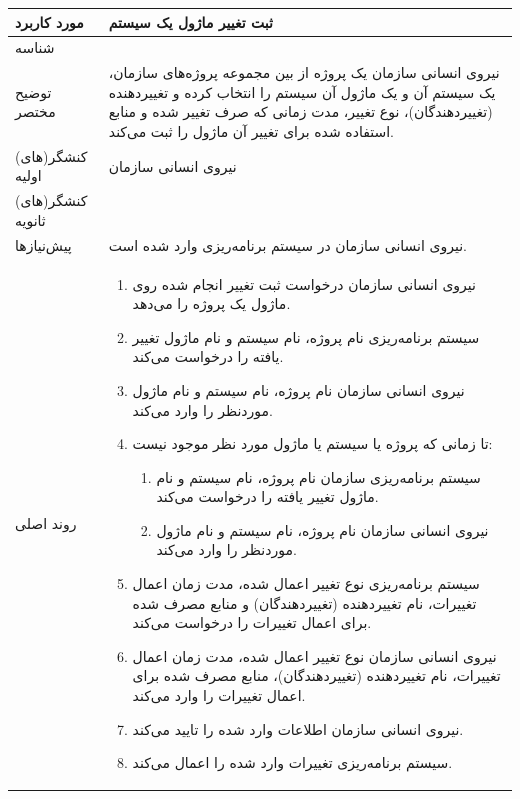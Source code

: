 \begin{table}[H]
	\centering
	\begin{tabular}{|p{3cm}|p{10cm}|}
		\hline
		
		
		مورد کاربرد	& ثبت تغییر ماژول یک سیستم  \\
		\hline
		
		شناسه & 
		\stepcounter{usecase_ID}
		
		\arabic{usecase_ID} \\
		
		\hline
		
		توضیح مختصر & نیروی انسانی سازمان یک پروژه از بین مجموعه پروژه‌های سازمان، یک سیستم آن و یک ماژول آن سیستم را انتخاب کرده و تغییردهنده (تغییردهندگان)، نوع تغییر، مدت زمانی که صرف تغییر شده و منابع استفاده شده برای تغییر آن ماژول را ثبت می‌کند. \\
		\hline
		
		کنشگر(های) اولیه & نیروی انسانی سازمان \\
		\hline
		
		کنشگر(های) ثانویه&  \\
		\hline
		
		پیش‌نیازها &
		نیروی انسانی سازمان در سیستم برنامه‌ریزی وارد شده است.\\
		\hline
		
		
		روند اصلی &
		\begin{enumerate}[topsep=0cm,leftmargin=0.5cm]
			\item نیروی انسانی سازمان درخواست  ثبت تغییر انجام شده روی ماژول یک پروژه را می‌دهد.
			\item سیستم برنامه‌ریزی نام پروژه، نام سیستم و نام ماژول تغییر یافته را درخواست می‌کند.
			\item نیروی انسانی سازمان نام پروژه، نام سیستم و نام ماژول موردنظر را وارد می‌کند.
			\item تا زمانی که پروژه یا سیستم یا ماژول مورد نظر موجود نیست:
			\begin{enumerate}[topsep=0cm,leftmargin=0.5cm]
				\item سیستم برنامه‌ریزی سازمان نام پروژه، نام سیستم و نام ماژول تغییر یافته را درخواست می‌کند.
				\item نیروی انسانی سازمان نام پروژه‌، نام سیستم و نام ماژول موردنظر را وارد می‌کند. 
			\end{enumerate}
			\item سیستم برنامه‌ریزی نوع تغییر اعمال شده، مدت زمان اعمال تغییرات، نام تغییردهنده (تغییردهندگان) و منابع  مصرف شده برای اعمال تغییرات را درخواست می‌کند.
			\item نیروی انسانی سازمان نوع تغییر اعمال شده، مدت زمان اعمال تغییرات، نام تغییردهنده (تغییردهندگان)، منابع  مصرف شده برای اعمال تغییرات را وارد می‌کند.
			\item نیروی انسانی سازمان اطلاعات وارد شده را تایید می‌کند.
			\item سیستم برنامه‌ریزی تغییرات وارد شده را اعمال می‌کند. 
		\end{enumerate}\\
		

\end{tabular}
\end{table}
